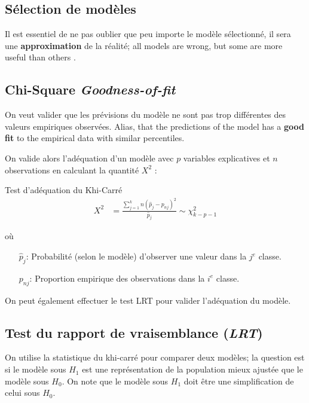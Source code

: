 \documentclass[10pt, french]{article}
\begin{document}
\begin{multicols*}{3}
\setcounter{section}{14}
\section{Sélection de modèles}

Il est essentiel de ne pas oublier que peu importe le modèle sélectionné, il sera une \textbf{approximation} de la réalité; \guillemotleft all models are wrong, but some are more useful than others \guillemotright.

\subsection*{Chi-Square \emph{Goodness-of-fit}}

On veut valider que les prévisions du modèle ne sont pas trop différentes des valeurs empiriques observées. 
Alias, that the predictions of the model has a \textbf{good fit} to the empirical data with similar percentiles.

On valide alors l'adéquation d'un modèle avec $p$ variables explicatives et $n$ observations en calculant la quantité $X^2$ : 
\begin{algo}{Test d'adéquation du Khi-Carré}
\begin{align*}
	X^2 
	&= 	\frac{\sum_{j = 1}^{k} n(\hat{p}_j - p_{nj})^2 }{\hat{p}_j} 
	\sim	\chi^{2}_{k - p - 1}
\end{align*}
\end{algo}

où 
\begin{enumerate}
	\item[$\hat{p}_j$:]	Probabilité (selon le modèle) d'observer une valeur dans la $j^{e}$ classe.
	\item[$p_{nj}$:]	Proportion empirique des observations dans la $i^{e}$ classe.
\end{enumerate}

On peut également effectuer le test LRT pour valider l'adéquation du modèle.

\subsection*{Test du rapport de vraisemblance (\emph{LRT})}
On utilise la statistique du khi-carré pour comparer deux modèles; la question est si le modèle sous $H_{1}$ est une représentation de la population mieux ajustée que le modèle sous $H_{0}$. 
On note que le modèle sous $H_{1}$ doit être une simplification de celui sous $H_{0}$.


\end{multicols*}
\end{document}
